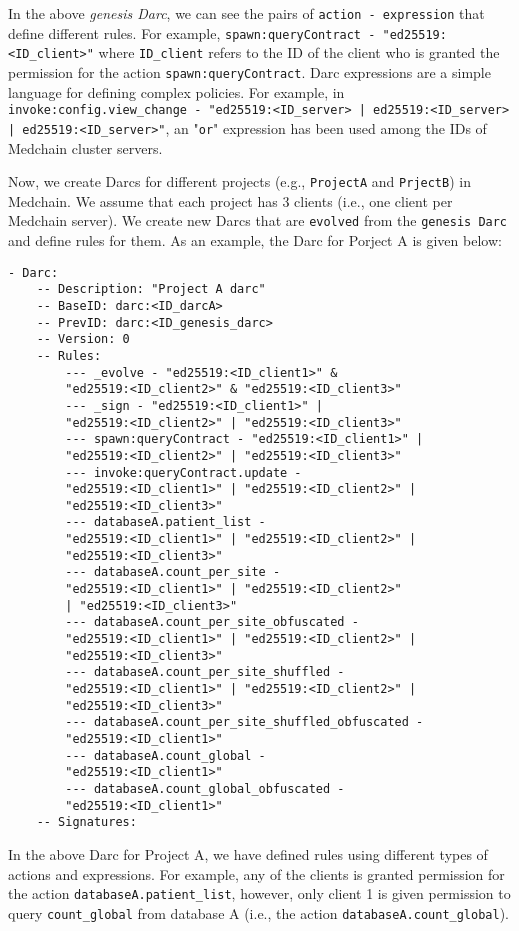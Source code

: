 In the above \textit{genesis Darc}, we can see the pairs of \texttt{action - expression} that define different rules. For example, \texttt{spawn:queryContract - "ed25519:<ID\_client>"} where \texttt{ID\_client} refers to the ID of the client who is granted the permission for the action \texttt{spawn:queryContract}. Darc expressions are a simple language for defining complex policies. For example, in \texttt{invoke:config.view\_change - "ed25519:<ID\_server> | ed25519:<ID\_server> | ed25519:<ID\_server>"}, an "\texttt{or}" expression has been used among the IDs of Medchain cluster servers. 

Now, we create Darcs for different projects (e.g., \texttt{ProjectA} and \texttt{PrjectB}) in Medchain. We assume that each project has 3 clients (i.e., one client per Medchain server). We create new Darcs that are \texttt{evolved} from the \texttt{genesis Darc} and define rules for them. As an example, the Darc for Porject A is given below:

\begin{verbatim}
- Darc:
    -- Description: "Project A darc"
    -- BaseID: darc:<ID_darcA>
    -- PrevID: darc:<ID_genesis_darc>
    -- Version: 0
    -- Rules:
        --- _evolve - "ed25519:<ID_client1>" & 
        "ed25519:<ID_client2>" & "ed25519:<ID_client3>"
        --- _sign - "ed25519:<ID_client1>" | 
        "ed25519:<ID_client2>" | "ed25519:<ID_client3>"
        --- spawn:queryContract - "ed25519:<ID_client1>" | 
        "ed25519:<ID_client2>" | "ed25519:<ID_client3>"
        --- invoke:queryContract.update - 
        "ed25519:<ID_client1>" | "ed25519:<ID_client2>" |
        "ed25519:<ID_client3>"
        --- databaseA.patient_list - 
        "ed25519:<ID_client1>" | "ed25519:<ID_client2>" |
        "ed25519:<ID_client3>"
        --- databaseA.count_per_site - 
        "ed25519:<ID_client1>" | "ed25519:<ID_client2>" 
        | "ed25519:<ID_client3>"
        --- databaseA.count_per_site_obfuscated - 
        "ed25519:<ID_client1>" | "ed25519:<ID_client2>" | 
        "ed25519:<ID_client3>"
        --- databaseA.count_per_site_shuffled - 
        "ed25519:<ID_client1>" | "ed25519:<ID_client2>" |
        "ed25519:<ID_client3>"
        --- databaseA.count_per_site_shuffled_obfuscated - 
        "ed25519:<ID_client1>" 
        --- databaseA.count_global - 
        "ed25519:<ID_client1>" 
        --- databaseA.count_global_obfuscated - 
        "ed25519:<ID_client1>" 
    -- Signatures:
\end{verbatim}

In the above Darc for Project A, we have defined rules using different types of actions and expressions. For example, any of the clients is granted permission for the action \texttt{databaseA.patient\_list}, however, only client 1 is given permission to query \texttt{count\_global} from database A (i.e., the action \texttt{databaseA.count\_global}). 

